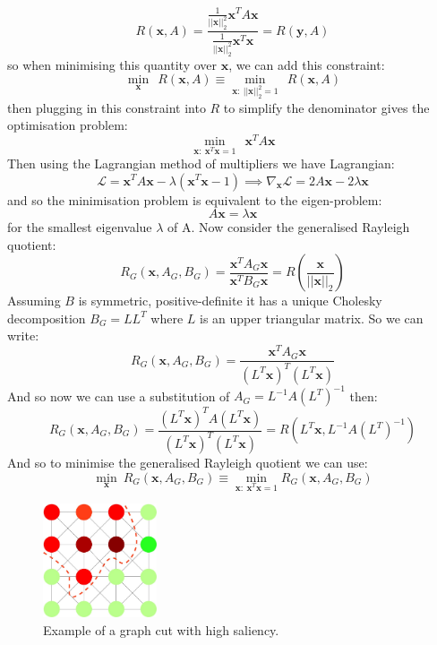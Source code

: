 \documentclass{report}
\begin{document}
\[R(\mathbf{x}, A) = \frac{\frac{1}{||\mathbf{x}||_2^2}\mathbf{x}^TA\mathbf{x}}{\frac{1}{||\mathbf{x}||_2^2}\mathbf{x}^T\mathbf{x}} = R(\mathbf{y}, A) \]
so when minimising this quantity over $\mathbf{x}$, we can add this constraint:
\[\underset{\mathbf{x}}{\min} \: \: R(\mathbf{x}, A)
\equiv \underset{\mathbf{x}: \: ||\mathbf{x}||_2^2 = 1}{\min} \: \: R(\mathbf{x}, A)
\] then plugging in this constraint into $R$ to simplify the denominator gives the optimisation problem:
\[\underset{\mathbf{x}: \: \mathbf{x}^T\mathbf{x}=1}{\min} \: \: \mathbf{x}^TA\mathbf{x}\]
Then using the Lagrangian method of multipliers \cite{dodge_2008} we have Lagrangian:
\[\mathcal{L} = \mathbf{x}^TA\mathbf{x} - \lambda(\mathbf{x}^T\mathbf{x} - 1) \implies \nabla_{\mathbf{x}} \mathcal{L} = 2A\mathbf{x} - 2 \lambda \mathbf{x}\]
and so the minimisation problem is equivalent to the eigen-problem: 
\[A\mathbf{x} = \lambda \mathbf{x}\] for the smallest eigenvalue $\lambda$ of A. Now consider the generalised Rayleigh quotient: 
\[R_G(\mathbf{x}, A_G,B_G) = \frac{\mathbf{x}^TA_G\mathbf{x}}{\mathbf{x}^TB_G\mathbf{x}} = R(\frac{\mathbf{x}}{||\mathbf{x}||_2})\]
Assuming $B$ is symmetric, positive-definite it has a unique Cholesky decomposition \cite{higham_2009} $B _G= LL^T$ where $L$ is an upper triangular matrix. So we can write: 
\[R_G(\mathbf{x}, A_G,B_G) =  \frac{\mathbf{x}^TA_G\mathbf{x}}{(L^T\mathbf{x})^T(L^T\mathbf{x})}\]
And so now we can use a substitution of $A_G = L^{-1}A(L^T)^{-1}$ then: 
\[R_G(\mathbf{x}, A_G,B_G) = \frac{(L^T\mathbf{x})^TA(L^T\mathbf{x})}{(L^T\mathbf{x})^T(L^T\mathbf{x})} = R(L^T\mathbf{x}, L^{-1}A(L^T)^{-1})\]
And so to minimise the generalised Rayleigh quotient we can use: 
\[\underset{\mathbf{x}}{\min} \: R_G(\mathbf{x}, A_G, B_G) \equiv \underset{\mathbf{x}:\: \mathbf{x}^T\mathbf{x}=1}{\min} R_G(\mathbf{x}, A_G, B_G) \]
\begin{figure}[h]
\centering
\includegraphics[width=0.3\textwidth]{GraphCutExample}
\caption{Example of a graph cut with high saliency.}
\end{figure}
\end{document}
